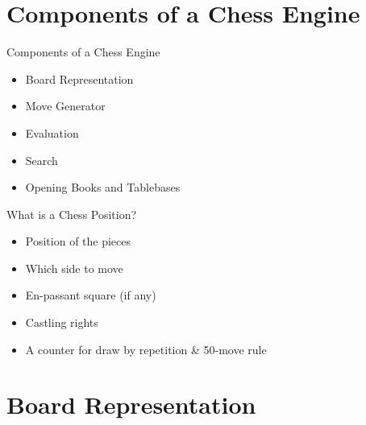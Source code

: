 \documentclass[xcolor=pdftex,dvipsnames,table]{beamer}
\begin{document}
\section{Components of a Chess Engine}

\begin{frame}{Components of a Chess Engine}
\begin{itemize}
\item Board Representation
\item Move Generator
\item Evaluation
\item Search
\item Opening Books and Tablebases
\end{itemize}
\end{frame}

\begin{frame}{What is a Chess Position?}
\begin{itemize}
\item Position of the pieces
\item Which side to move
\item En-passant square (if any)
\item Castling rights
\item A counter for draw by repetition \& 50-move rule
\end{itemize}
\end{frame}

\section{Board Representation}
\end{document}

